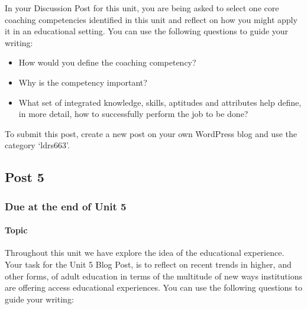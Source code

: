 \documentclass[
]{book}
\providecommand{\tightlist}{%
  \setlength{\itemsep}{0pt}\setlength{\parskip}{0pt}}
\begin{document}
In your Discussion Post for this unit, you are being asked to select one core coaching competencies identified in this unit and reflect on how you might apply it in an educational setting. You can use the following questions to guide your writing:

\begin{itemize}
\tightlist
\item
  How would you define the coaching competency?\\
\item
  Why is the competency important?\\
\item
  What set of integrated knowledge, skills, aptitudes and attributes help define, in more detail, how to successfully perform the job to be done?
\end{itemize}

To submit this post, create a new post on your own WordPress blog and use the category `ldrs663'.

\hypertarget{post-5}{%
\subsection*{Post 5}\label{post-5}}

\hypertarget{due-at-the-end-of-unit-5}{%
\subsubsection*{Due at the end of Unit 5}\label{due-at-the-end-of-unit-5}}

\hypertarget{topic-2}{%
\paragraph*{Topic}\label{topic-2}}

Throughout this unit we have explore the idea of the educational experience. Your task for the Unit 5 Blog Post, is to reflect on recent trends in higher, and other forms, of adult education in terms of the multitude of new ways institutions are offering access educational experiences. You can use the following questions to guide your writing:
\end{document}
